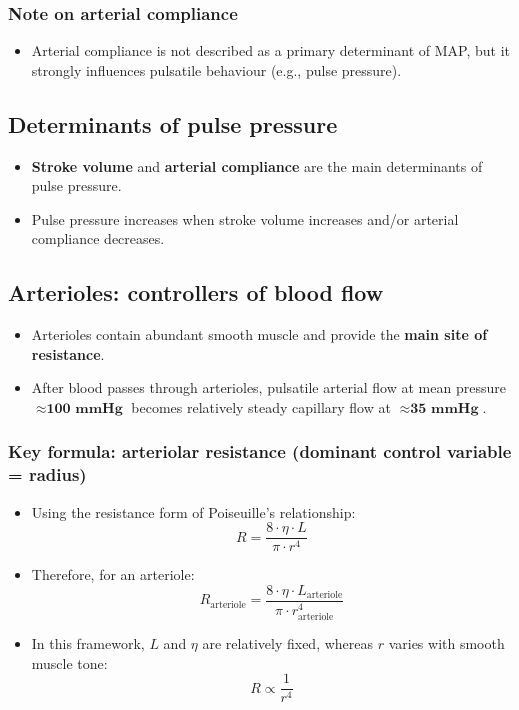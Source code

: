 \documentclass[11pt,a4paper]{article}
\begin{document}
\subsubsection{Note on arterial compliance}
\begin{itemize}
\item Arterial compliance is not described as a primary determinant of MAP, but it strongly influences pulsatile behaviour (e.g., pulse pressure).
\end{itemize}

\subsection{Determinants of pulse pressure}
\begin{itemize}
\item \textbf{Stroke volume} and \textbf{arterial compliance} are the main determinants of pulse pressure.
\item Pulse pressure increases when stroke volume increases and/or arterial compliance decreases.
\end{itemize}

\subsection{Arterioles: controllers of blood flow}
\begin{itemize}
\item Arterioles contain abundant smooth muscle and provide the \textbf{main site of resistance}.
\item After blood passes through arterioles, pulsatile arterial flow at mean pressure $\approx \textbf{100 mmHg}$ becomes relatively steady capillary flow at $\approx \textbf{35 mmHg}$.
\end{itemize}

\subsubsection{Key formula: arteriolar resistance (dominant control variable = radius)}
\begin{itemize}
\item Using the resistance form of Poiseuille’s relationship:
  \[
  R = \frac{8\cdot \eta \cdot L}{\pi \cdot r^4}
  \]
\item Therefore, for an arteriole:
  \[
  R_{\text{arteriole}} = \frac{8\cdot \eta \cdot L_{\text{arteriole}}}{\pi \cdot r_{\text{arteriole}}^4}
  \]
\item In this framework, $L$ and $\eta$ are relatively fixed, whereas $r$ varies with smooth muscle tone:
\[
R \propto \frac{1}{r^4}
\]
\end{itemize}
\end{document}
